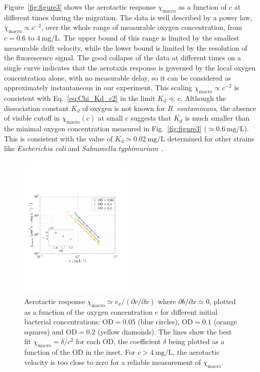 \documentclass[aps,a4paper,twocolumn,10pt,pre,showpacs]{revtex4-2}
\begin{document}
Figure~\ref{fig:figure3} shows the aerotactic response $\chi_\mathrm{macro}$ as a function of $c$ at different times during the migration. The data is well described by a power law, $\chi_\mathrm{macro} \propto c^{-2}$, over the whole range of measurable oxygen concentration, from $c=0.6$ to $\SI{4}{\mg\per\liter}$. The upper bound of this range is limited by the smallest measurable drift velocity, while the lower bound is limited by the resolution of the fluorescence signal. The good collapse of the data at different times on a single curve indicates that the aerotaxis response is governed by the local oxygen concentration alone, with no measurable delay, so it can be considered as approximately instantaneous in our experiment. This scaling $\chi_\mathrm{macro} \propto c^{-2}$ is consistent with Eq.~\eqref{eq:Chi_Kd_c2} in the limit $K_d \ll c$. Although the dissociation constant $K_d$ of oxygen is not known for \emph{B. contaminans}, the absence of visible cutoff in $\chi_\mathrm{macro}(c)$ at small $c$ suggests that $K_d$ is much smaller than the minimal oxygen concentration measured in Fig.~\ref{fig:figure3} ($\simeq \SI{0.6}{\mg\per\liter}$). This is consistent with the value of $K_d \simeq \SI{0.02}{\mg\per\liter}$ determined for other strains like \emph{Escherichia coli} and \emph{Salmonella typhimurium}~\cite{shioi1987oxygen}.

\begin{figure}[b]
\includegraphics[trim = 8mm 63mm 19mm 70mm, clip, width=0.48\textwidth, angle=0]{Fig06.pdf}
\caption{Aerotactic response $\chi_{\mathrm{macro}} \simeq v_x/({\partial c}/{\partial x})$ where $\partial b/\partial x \simeq 0$, plotted as a function of the oxygen concentration $c$ for different initial bacterial concentrations: $\text{OD}=0.05$ (blue circles), $\text{OD}=0.1$ (orange squares) and $\text{OD}=0.2$ (yellow diamonds). The lines show the best fit $\chi_{\mathrm{macro}}=\delta/c^2$ for each OD, the coefficient $\delta$ being plotted as a function of the OD in the inset. For $c>\SI{4}{\mg\per\liter}$, the aerotactic velocity is too close to zero for a reliable measurement of $\chi_\mathrm{macro}$.}
\label{fig:chi_macro}
\end{figure}
\end{document}
